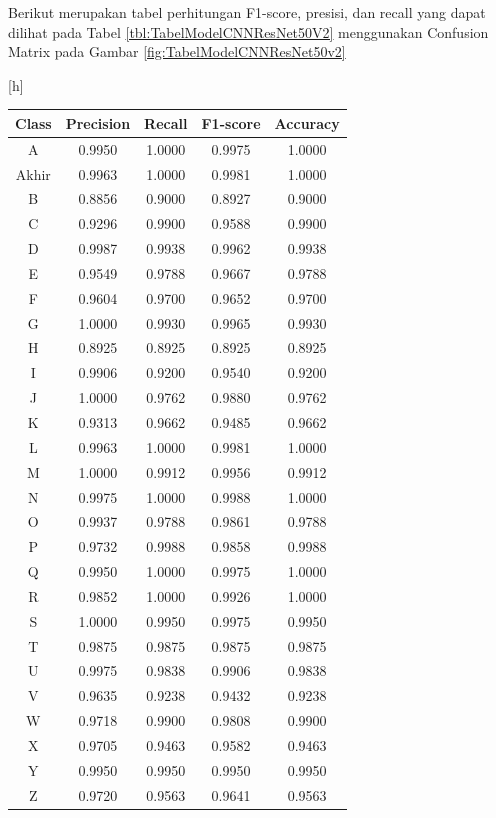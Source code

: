 Berikut merupakan tabel perhitungan F1-score, presisi, dan recall yang dapat dilihat pada Tabel \ref{tbl:TabelModelCNNResNet50V2} menggunakan Confusion Matrix pada Gambar \ref{fig:TabelModelCNNResNet50v2}

\begin{center}[h]
	\begin{table}[htbp]
	\centering
	\label{tbl:Tabel Confusion Matrix ResNet50V2}
	\begin{tabular}{|c|c|c|c|c|}
	\hline
	Class & Precision & Recall & F1-score & Accuracy \\
	\hline
	A & 0.9950 & 1.0000 & 0.9975 & 1.0000 \\
	Akhir & 0.9963 & 1.0000 & 0.9981 & 1.0000 \\
	B & 0.8856 & 0.9000 & 0.8927 & 0.9000 \\
	C & 0.9296 & 0.9900 & 0.9588 & 0.9900 \\
	D & 0.9987 & 0.9938 & 0.9962 & 0.9938 \\
	E & 0.9549 & 0.9788 & 0.9667 & 0.9788 \\
	F & 0.9604 & 0.9700 & 0.9652 & 0.9700 \\
	G & 1.0000 & 0.9930 & 0.9965 & 0.9930 \\
	H & 0.8925 & 0.8925 & 0.8925 & 0.8925 \\
	I & 0.9906 & 0.9200 & 0.9540 & 0.9200 \\
	J & 1.0000 & 0.9762 & 0.9880 & 0.9762 \\
	K & 0.9313 & 0.9662 & 0.9485 & 0.9662 \\
	L & 0.9963 & 1.0000 & 0.9981 & 1.0000 \\
	M & 1.0000 & 0.9912 & 0.9956 & 0.9912 \\
	N & 0.9975 & 1.0000 & 0.9988 & 1.0000 \\
	O & 0.9937 & 0.9788 & 0.9861 & 0.9788 \\
	P & 0.9732 & 0.9988 & 0.9858 & 0.9988 \\
	Q & 0.9950 & 1.0000 & 0.9975 & 1.0000 \\
	R & 0.9852 & 1.0000 & 0.9926 & 1.0000 \\
	S & 1.0000 & 0.9950 & 0.9975 & 0.9950 \\
	T & 0.9875 & 0.9875 & 0.9875 & 0.9875 \\
	U & 0.9975 & 0.9838 & 0.9906 & 0.9838 \\
	V & 0.9635 & 0.9238 & 0.9432 & 0.9238 \\
	W & 0.9718 & 0.9900 & 0.9808 & 0.9900 \\
	X & 0.9705 & 0.9463 & 0.9582 & 0.9463 \\
	Y & 0.9950 & 0.9950 & 0.9950 & 0.9950 \\
	Z & 0.9720 & 0.9563 & 0.9641 & 0.9563 \\
	\hline
	\end{tabular}
	\end{table}
\end{center}

